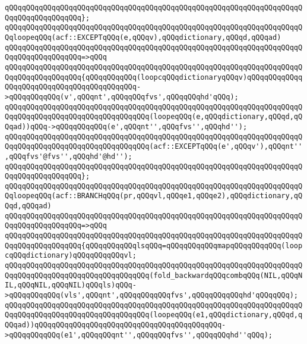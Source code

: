 \verb|qQQqqQQqqQQqqQQqqQQqqQQqqQQqqQQqqQQqqQQqqQQqqQQqqQQqqQQqqQQqqQQqqQQqqQQqqQQqqQQqqQQqqQQq};|\newline
\newline
\verb|qQQqqQQqqQQqqQQqqQQqqQQqqQQqqQQqqQQqqQQqqQQqqQQqqQQqqQQqqQQqqQQqqQQqqQQqloopeqQQq(acf::EXCEPTqQQq(e,qQQqv),qQQqdictionary,qQQqd,qQQqad)|\newline
\verb|qQQqqQQqqQQqqQQqqQQqqQQqqQQqqQQqqQQqqQQqqQQqqQQqqQQqqQQqqQQqqQQqqQQqqQQqqQQqqQQqqQQqqQQq=>qQQq|\newline
\verb|qQQqqQQqqQQqqQQqqQQqqQQqqQQqqQQqqQQqqQQqqQQqqQQqqQQqqQQqqQQqqQQqqQQqqQQqqQQqqQQqqQQqqQQq{qQQqqQQqqQQq(loopcqQQqdictionaryqQQqv)qQQqqQQqqQQqqQQqqQQqqQQqqQQqqQQqqQQqqQQqqQQq->qQQqqQQqqQQq(v',qQQqnt',qQQqqQQqfvs',qQQqqQQqhd'qQQq);|\newline
\verb|qQQqqQQqqQQqqQQqqQQqqQQqqQQqqQQqqQQqqQQqqQQqqQQqqQQqqQQqqQQqqQQqqQQqqQQqqQQqqQQqqQQqqQQqqQQqqQQqqQQqqQQq(loopeqQQq(e,qQQqdictionary,qQQqd,qQQqad))qQQq->qQQqqQQqqQQq(e',qQQqnt'',qQQqfvs'',qQQqhd'');|\newline
\newline
\verb|qQQqqQQqqQQqqQQqqQQqqQQqqQQqqQQqqQQqqQQqqQQqqQQqqQQqqQQqqQQqqQQqqQQqqQQqqQQqqQQqqQQqqQQqqQQqqQQqqQQqqQQq(acf::EXCEPTqQQq(e',qQQqv'),qQQqnt'',qQQqfvs'@fvs'',qQQqhd'@hd'');|\newline
\verb|qQQqqQQqqQQqqQQqqQQqqQQqqQQqqQQqqQQqqQQqqQQqqQQqqQQqqQQqqQQqqQQqqQQqqQQqqQQqqQQqqQQqqQQq};|\newline
\newline
\verb|qQQqqQQqqQQqqQQqqQQqqQQqqQQqqQQqqQQqqQQqqQQqqQQqqQQqqQQqqQQqqQQqqQQqqQQqloopeqQQq(acf::BRANCHqQQq(pr,qQQqvl,qQQqe1,qQQqe2),qQQqdictionary,qQQqd,qQQqad)|\newline
\verb|qQQqqQQqqQQqqQQqqQQqqQQqqQQqqQQqqQQqqQQqqQQqqQQqqQQqqQQqqQQqqQQqqQQqqQQqqQQqqQQqqQQqqQQq=>qQQq|\newline
\verb|qQQqqQQqqQQqqQQqqQQqqQQqqQQqqQQqqQQqqQQqqQQqqQQqqQQqqQQqqQQqqQQqqQQqqQQqqQQqqQQqqQQqqQQq{qQQqqQQqqQQqlsqQQq=qQQqqQQqqQQqmapqQQqqQQqqQQq(loopcqQQqdictionary)qQQqqQQqqQQqvl;|\newline
\newline
\verb|qQQqqQQqqQQqqQQqqQQqqQQqqQQqqQQqqQQqqQQqqQQqqQQqqQQqqQQqqQQqqQQqqQQqqQQqqQQqqQQqqQQqqQQqqQQqqQQqqQQqqQQq(fold_backwardqQQqcombqQQq(NIL,qQQqNIL,qQQqNIL,qQQqNIL)qQQqls)qQQq->qQQqqQQqqQQq(vls',qQQqnt',qQQqqQQqqQQqfvs',qQQqqQQqqQQqhd'qQQqqQQq);|\newline
\verb|qQQqqQQqqQQqqQQqqQQqqQQqqQQqqQQqqQQqqQQqqQQqqQQqqQQqqQQqqQQqqQQqqQQqqQQqqQQqqQQqqQQqqQQqqQQqqQQqqQQqqQQq(loopeqQQq(e1,qQQqdictionary,qQQqd,qQQqad))qQQqqQQqqQQqqQQqqQQqqQQqqQQqqQQqqQQqqQQqqQQq->qQQqqQQqqQQq(e1',qQQqqQQqnt'',qQQqqQQqfvs'',qQQqqQQqhd''qQQq);|\newline
